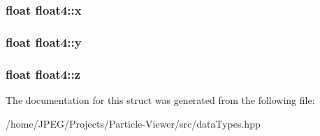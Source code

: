 \subsubsection[{x}]{\setlength{\rightskip}{0pt plus 5cm}float float4\+::x}\label{structfloat4_ab60e7164162636ef8d0315cf18269b0f}
\hypertarget{structfloat4_a72bce4984c96cef3d6a50adcbce6e388}{}
\subsubsection[{y}]{\setlength{\rightskip}{0pt plus 5cm}float float4\+::y}\label{structfloat4_a72bce4984c96cef3d6a50adcbce6e388}
\hypertarget{structfloat4_a898443ac0132ee9f149661c63882361b}{}
\subsubsection[{z}]{\setlength{\rightskip}{0pt plus 5cm}float float4\+::z}\label{structfloat4_a898443ac0132ee9f149661c63882361b}


The documentation for this struct was generated from the following file\+:\begin{DoxyCompactItemize}
\item 
/home/\+J\+P\+E\+G/\+Projects/\+Particle-\/\+Viewer/src/data\+Types.\+hpp\end{DoxyCompactItemize}
